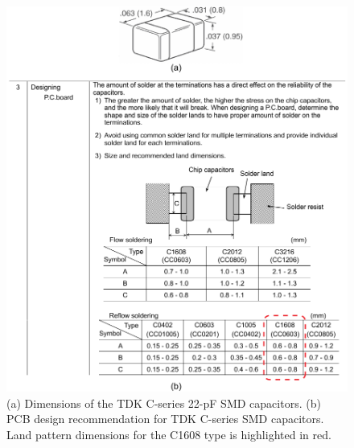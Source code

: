 \documentclass[12pt,letterpaper]{scrartcl}
\begin{document}
	\begin{figure}[hp]
		\centering
		\includegraphics{tdk_cap_datasheet}
		\caption{(a) Dimensions of the TDK C-series 22-pF SMD capacitors. (b) PCB design recommendation for TDK C-series SMD capacitors. Land pattern dimensions for the C1608 type is highlighted in red.}
		\label{fig:tdk_cap_datasheet}
	\end{figure}
\end{document}
